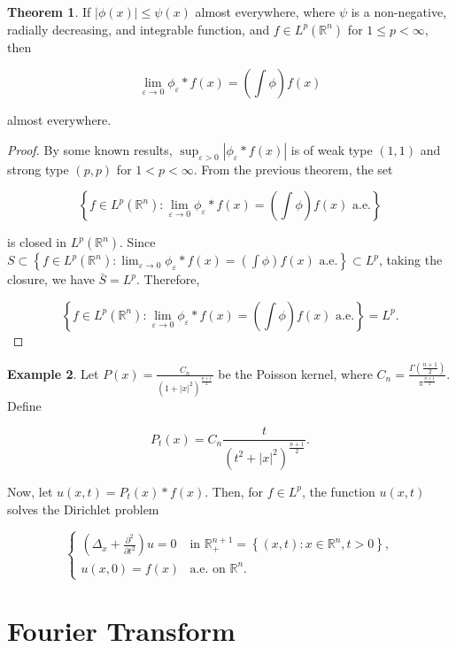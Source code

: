\documentclass[12pt,openany]{book}
\theoremstyle{definition}
\newtheorem{theorem}{Theorem}[section]
\newtheorem{example}[theorem]{Example}
\begin{document}
\begin{theorem}
  If $|\phi(x)| \leqslant \psi(x)$ almost everywhere, where $\psi$ is a non-negative, radially decreasing, and integrable function, and $f \in L^p\left(\mathbb{R}^n\right)$ for $1 \leq p < \infty$, then

$$\lim _{\varepsilon \rightarrow 0} \phi_{\varepsilon} * f(x) = \left(\int \phi\right) f(x)$$

almost everywhere.  
\end{theorem}
\begin{proof}
    By some known results, $\sup _{\varepsilon>0}\left|\phi_{\varepsilon} * f(x)\right|$ is of weak type $(1,1)$ and strong type $(p, p)$ for $1 < p < \infty$.
From the previous theorem, the set

$$\left\{f \in L^p\left(\mathbb{R}^n\right): \lim _{\varepsilon \rightarrow 0} \phi_{\varepsilon} * f(x) = \left(\int \phi\right) f(x) \text{ a.e.}\right\}$$

is closed in $L^p\left(\mathbb{R}^n\right)$.
Since $S \subset \left\{f \in L^p\left(\mathbb{R}^n\right): \lim _{\varepsilon \rightarrow 0} \phi_{\varepsilon} * f(x) = \left(\int \phi\right) f(x) \text{ a.e.}\right\} \subset L^p$,
taking the closure, we have $\bar{S} = L^p$.
Therefore,

$$\left\{f \in L^p\left(\mathbb{R}^n\right): \lim _{\varepsilon \rightarrow 0} \phi_{\varepsilon} * f(x) = \left(\int \phi\right) f(x) \text{ a.e.}\right\} = L^p.$$
\end{proof}
\begin{example}
    Let $P(x) = \frac{C_n}{\left(1 + |x|^2\right)^{\frac{n+1}{2}}}$ be the Poisson kernel, where $C_n = \frac{\Gamma\left(\frac{n+1}{2}\right)}{\pi^{\frac{n+1}{2}}}$.
Define

$$P_t(x) = C_n \frac{t}{\left(t^2 + |x|^2\right)^{\frac{n+1}{2}}}.$$

Now, let $u(x, t) = P_t(x) * f(x)$. Then, for $f \in L^p$, the function $u(x, t)$ solves the Dirichlet problem

$$\begin{cases}
\left(\Delta_x + \frac{\partial^2}{\partial t^2}\right) u = 0 & \text{in } \mathbb{R}_{+}^{n+1} = \left\{(x, t): x \in \mathbb{R}^n, t > 0\right\}, \\
u(x, 0) = f(x) & \text{a.e. on } \mathbb{R}^n.
\end{cases}$$
\end{example}
\chapter{Fourier Transform}
\end{document}
